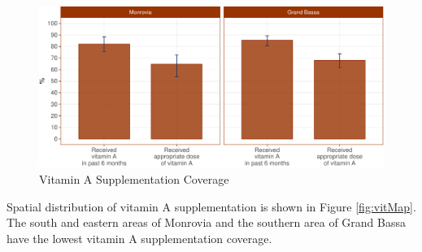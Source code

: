 \documentclass[12pt,a4paper]{article}
\theoremstyle{definition}
\theoremstyle{definition}
\theoremstyle{definition}
\theoremstyle{remark}
\begin{document}
\begin{figure}[H]

{\centering \includegraphics{liberiaCoverageReport_files/figure-latex/vit1-1} 

}

\caption{Vitamin A Supplementation Coverage}\label{fig:vit1}
\end{figure}

\begin{table}[H]

\caption{\label{tab:vit2}Vitamin A Supplementation Coverage}
\centering
{}
\end{table}

Spatial distribution of vitamin A supplementation is shown in Figure
\ref{fig:vitMap}. The south and eastern areas of Monrovia and the
southern area of Grand Bassa have the lowest vitamin A supplementation
coverage.
\end{document}
